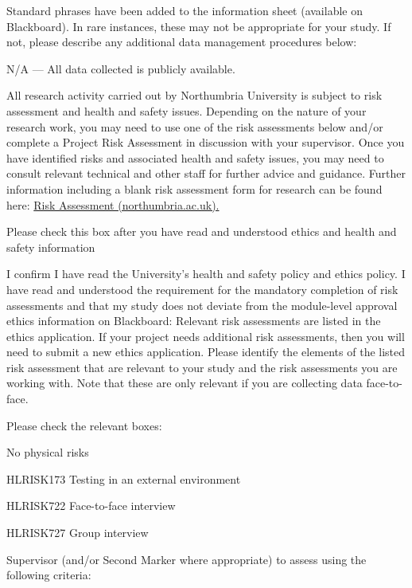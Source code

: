\documentclass[../CHEFCookingHelper.tex]{subfiles}
\begin{document}
Standard phrases have been added to the information sheet (available on Blackboard). In rare instances,
these may not be appropriate for your study. If not,
please describe any additional data management procedures below:

N/A --- All data collected is publicly available.

All research activity carried out by Northumbria University is subject to risk assessment and health and safety
issues. Depending on the nature of your research work, you may need to use one of the risk assessments below
and/or complete a Project Risk Assessment in discussion with your supervisor. Once you have identified risks
and associated health and safety issues, you may need to consult relevant technical and other staff for further
advice and guidance. Further information including a blank risk assessment form for research can be found here:
\href{https://www.northumbria.ac.uk/about-us/health-safety-resources/risk-assessment/}{Risk Assessment (northumbria.ac.uk).}

Please check this box after you have read and understood ethics and health and safety information

   I confirm I have read the University's health and safety policy and ethics policy.
I have read and understood the requirement for the mandatory completion of risk assessments and that my study
does not deviate from the module-level approval ethics information on Blackboard: Relevant risk assessments
are listed in the ethics application. If your project needs additional risk assessments, then you will need
to submit a new ethics application. Please identify the elements of the listed risk assessment that are relevant
to your study and the risk assessments you are working with. Note that these are only relevant if you are
collecting data face-to-face.

Please check the relevant boxes:

   No physical risks

   HL\textunderscore{}RISK\textunderscore{}173 Testing in an external environment

   HL\textunderscore{}RISK\textunderscore{}722 Face-to-face interview

   HL\textunderscore{}RISK\textunderscore{}727 Group interview

Supervisor (and/or Second Marker where appropriate) to assess using the following criteria:
\end{document}
